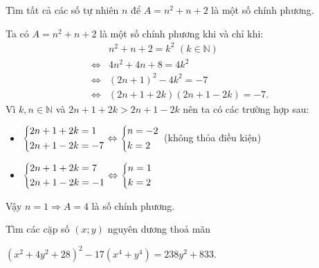 \begin{bt}%
Tìm tất cả các số tự nhiên $n$ để $A=n^2+n+2$ là một số chính phương.
\loigiai
	{Ta có 	$A=n^2+n+2$ là một số chính phương khi và chỉ khi:
		{\allowdisplaybreaks
		\begin{align*}
		&n^2+n+2=k^2 \,\, (k\in\mathbb{N})\\
		\Leftrightarrow& 4n^2+4n+8=4k^2\\
		\Leftrightarrow&(2n+1)^2-4k^2=-7\\
		\Leftrightarrow&(2n+1+2k)(2n+1-2k)=-7.
		\end{align*}}Vì $k,n\in\mathbb{N}$ và $2n+1+2k>2n+1-2k$ nên ta có các trường hợp sau: 
		\hfill
		\begin{itemize}
			\item $\left\{\begin{aligned}&2n+1+2k=1\\&2n+1-2k=-7\end{aligned}\right.\Leftrightarrow \left\{\begin{aligned}&n=-2\\&k=2\end{aligned}\right.$ (không thỏa điều kiện)
			\item $\left\{\begin{aligned}&2n+1+2k=7\\&2n+1-2k=-1\end{aligned}\right.\Leftrightarrow \left\{\begin{aligned}&n=1\\&k=2\end{aligned}\right.$
		\end{itemize}
		Vậy $n=1\Rightarrow A=4$ là số chính phương.
	}
\end{bt}

\begin{bt}%
	\hfill
	
	
	
	Tìm các cặp số $(x; y)$ nguyên dương thoả mãn
	\begin{center}
		$ (x^2+4y^2+28)^2-17(x^4+y^4)=238y^2 +833.$
	\end{center}
\end{bt}

